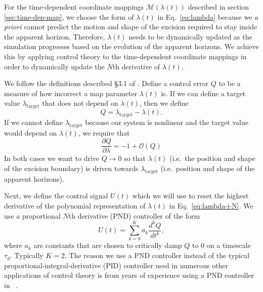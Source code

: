 \begin{bibunit}[unsrtnat]
For the time-dependent coordinate mappings $\mathcal{M}(\lambda(t))$ described
in section \ref{sec:time-dep-map}, we choose the form of $\lambda(t)$ in
Eq.~\eqref{eq:lambda} because we \textit{a priori} cannot predict the motion and
shape of the excision required to stay inside the apparent horizon. Therefore,
$\lambda(t)$ needs to be dynamically updated as the simulation progresses based
on the evolution of the apparent horizons. We achieve this by applying control
theory to the time-dependent coordinate mappings in order to dynamically update
the $N$th derivative of $\lambda(t)$.

We follow the definitions described \S 3.1 of \cite{Hemberger:2012jz}. Define
a control error $Q$ to be a measure of how incorrect a map parameter
$\lambda(t)$ is.
If we can define a target value $\lambda_{\textrm{target}}$ that
does not depend on $\lambda(t)$, then we define
\begin{equation}
  \label{eq:control-error-linear}
  Q = \lambda_{\textrm{target}} - \lambda(t).
\end{equation}
If we cannot define $\lambda_{\textrm{target}}$ because our system is nonlinear
and the target value would depend on $\lambda(t)$, we require that
\begin{equation}
  \label{eq:control-error-nonlinear}
  \frac{\partial Q}{\partial \lambda} = -1 + \mathcal{O}(Q)
\end{equation}
In both cases we want to drive $Q\rightarrow 0$ so that $\lambda(t)$ (i.e.~the
position and shape of the excision boundary) is driven towards
$\lambda_\textrm{target}$ (i.e.~position and shape of the apparent horizons).

Next, we define the control signal $U(t)$ which we will use to reset the highest
derivative of the polynomial representation of $\lambda(t)$ in
Eq.~\eqref{eq:lambda-i-N}. We use a proportional $N$th derivative (PND)
controller of the form
\begin{equation}
  \label{eq:control-signal}
  U(t) = \sum_{k=0}^{K} a_{k}\frac{d^{k}Q}{dt^{k}},
\end{equation}
where $a_{k}$ are constants that are chosen to critically damp $Q$ to 0 on a
timescale $\tau_{d}$. Typically $K = 2$. The reason we use a PND controller
instead of the typical proportional-integral-derivative (PID) controller used in
numerous other applications of control theory is from years of experience
using a PND controller in \spec~\cite{Hemberger:2012jz}.


\end{bibunit}
